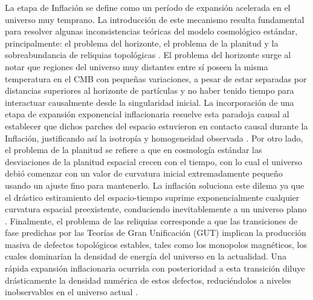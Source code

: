 La etapa de Inflación se define como un período de expansión acelerada en el universo muy temprano. La introducción de este mecanismo resulta fundamental para resolver algunas inconsistencias teóricas del modelo cosmológico estándar, principalmente: el problema del horizonte, el problema de la planitud y la sobreabundancia de reliquias topológicas \cite{Baumann_2012, Doddelson}.  El problema del horizonte surge al notar que regiones del universo muy distantes entre sí poseen la misma temperatura en el CMB con pequeñas variaciones, a pesar de estar separadas por distancias superiores al horizonte de partículas y no haber tenido tiempo para interactuar causalmente desde la singularidad inicial. La incorporación de una etapa de expansión exponencial inflacionaria resuelve esta paradoja causal al establecer que dichos parches del espacio estuvieron en contacto causal durante la Inflación, justificando así la isotropía y homogeneidad observada \cite{Weinberg}.  Por otro lado, el problema de la planitud se refiere a que en cosmología estándar las desviaciones de la planitud espacial crecen con el tiempo, con lo cual el universo debió comenzar con un valor de curvatura inicial extremadamente pequeño usando un ajuste fino para mantenerlo. La inflación soluciona este dilema  ya que el drástico estiramiento del espacio-tiempo suprime exponencialmente cualquier curvatura espacial preexistente, conduciendo inevitablemente a un universo plano \cite{Peter_2009}.  Finalmente, el problema de las reliquias corresponde a que las transiciones de fase predichas por las Teorías de Gran Unificación (GUT) implican la producción masiva de defectos topológicos estables, tales como los monopolos magnéticos, los cuales dominarían la densidad de energía del universo en la actualidad. Una rápida expansión inflacionaria ocurrida con posterioridad a esta transición diluye drásticamente la densidad numérica de estos defectos, reduciéndolos a niveles inobservables en el universo actual \cite{Baumann_2012}.

